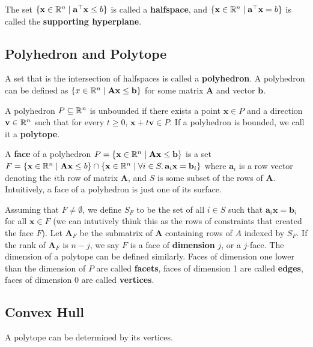 The set $\{ \mathbf{x} \in \mathbb{R}^n \mid \mathbf{a}^\top \mathbf{x} \leq b \}$ is called a \textbf{halfspace}, and $\{ \mathbf{x} \in \mathbb{R}^n \mid \mathbf{a}^\top \mathbf{x} = b \}$ is called the \textbf{supporting hyperplane}.

\subsection{Polyhedron and Polytope}    

A set that is the intersection of halfspaces is called a \textbf{polyhedron}. A polyhedron can be defined as $\{x \in \mathbb{R}^n \mid \mathbf{A}\mathbf{x} \leq \mathbf{b} \}$ for some matrix $\mathbf{A}$ and vector $\mathbf{b}$.

A polyhedron $P \subseteq \mathbb{R}^n$ is unbounded if there exists a point $\mathbf{x} \in P$ and a direction $\mathbf{v} \in \mathbb{R}^n$ such that for every $t \geq 0$, $\mathbf{x} + t \mathbf{v} \in P$. If a polyhedron is bounded, we call it a \textbf{polytope}.

A \textbf{face} of a polyhedron $P = \{\mathbf{x} \in \mathbb{R}^n \mid \mathbf{A}\mathbf{x} \leq \mathbf{b} \}$ is a set $F = \{ \mathbf{x} \in \mathbb{R}^n \mid \mathbf{A}\mathbf{x} \leq b \} \cap \{ \mathbf{x} \in \mathbb{R}^n \mid \forall i \in S.\, \mathbf{a}_i \mathbf{x} = \mathbf{b}_i \}$ where $\mathbf{a}_i$ is a row vector denoting the $i$th row of matrix $\mathbf{A}$, and $S$ is some subset of the rows of $\mathbf{A}$. Intuitively, a face of a polyhedron is just one of its surface.

Assuming that $F \neq \emptyset$, we define $S_F$ to be the set of all $i \in S$ such that $\mathbf{a}_i \mathbf{x} = \mathbf{b}_i$ for all $\mathbf{x} \in F$ (we can intutively think this as the rows of constraints that created the face $F$). Let $\mathbf{A}_F$ be the submatrix of $\mathbf{A}$ containing rows of $A$ indexed by $S_F$. If the rank of $\mathbf{A}_F$ is $n-j$, we say $F$ is a face of \textbf{dimension} $j$, or a $j$-face. The dimension of a polytope can be defined similarly. Faces of dimension one lower than the dimension of $P$ are called \textbf{facets}, faces of dimension 1 are called \textbf{edges}, faces of dimension 0 are called \textbf{vertices}.

\subsection{Convex Hull}

A polytope can be determined by its vertices.

